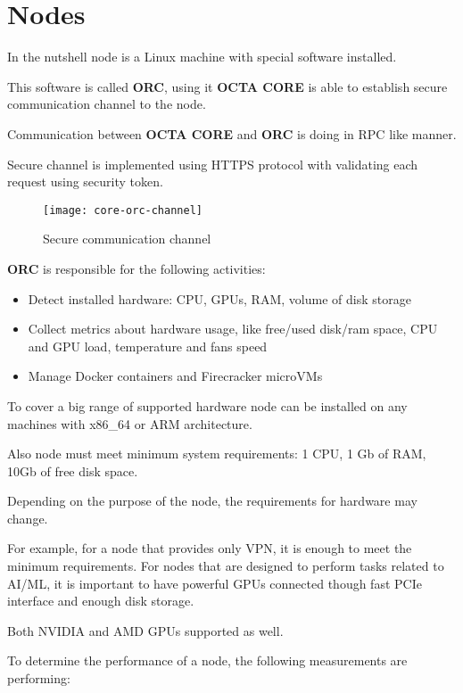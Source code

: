 \section{Nodes}

In the nutshell node is a Linux machine with special software installed.

This software is called \textbf{ORC}, using it \textbf{OCTA CORE} is able to establish secure communication channel to the node.

Communication between \textbf{OCTA CORE} and \textbf{ORC} is doing in RPC\cite{rpc} like manner.

Secure channel is implemented using HTTPS\cite{https} protocol with validating each request using security token.

\begin{figure}[H]
    \centering
    \texttt{[image: core-orc-channel]}
    \caption{Secure communication channel}
\end{figure}

\textbf{ORC} is responsible for the following activities:

\begin{itemize}
    \item Detect installed hardware: CPU, GPUs, RAM, volume of disk storage
    \item Collect metrics about hardware usage, like free/used disk/ram space, CPU and GPU load, temperature and fans speed
    \item Manage Docker\cite{docker} containers and Firecracker\cite{firecracker} microVMs
\end{itemize}

To cover a big range of supported hardware node can be installed on any machines with x86\_64\cite{x86_64} or ARM\cite{arm} architecture.

Also node must meet minimum system requirements: 1 CPU, 1 Gb of RAM, 10Gb of free disk space.

Depending on the purpose of the node, the requirements for hardware may change.

For example, for a node that provides only VPN, it is enough to meet the minimum requirements.
For nodes that are designed to perform tasks related to AI/ML, it is important to have powerful GPUs connected though fast PCIe interface and enough disk storage.

Both NVIDIA and AMD GPUs supported as well.

To determine the performance of a node, the following measurements are performing:

